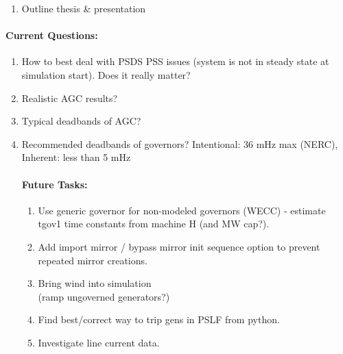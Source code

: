 \documentclass[12pt]{article}
\begin{document}
\begin{multicols}{2}
\begin{enumerate}
		\item Outline thesis \& presentation

		
		

	\end{enumerate}

	\paragraph{Current Questions:}
	\begin{enumerate}
	\item How to best deal with PSDS PSS issues (system is not in steady state at simulation start). Does it really matter?
		
	\item Realistic AGC results?
	\item Typical deadbands of AGC?
	\item Recommended deadbands of  governors? Intentional: 36 mHz max (NERC), \\Inherent: less than 5 mHz

\vfill\null
\columnbreak

\paragraph{Future Tasks:} %
	\begin{enumerate}

		\item Use generic governor for non-modeled governors (WECC) - estimate tgov1 time constants from machine H (and MW cap?).		
		
		\item Add import mirror / bypass mirror init sequence option to prevent repeated mirror creations.

		\item Bring wind into simulation \\ (ramp ungoverned generators?)

		\item Find best/correct way to trip gens in PSLF from python.

		\item Investigate line current data.
		

\end{enumerate}
\end{enumerate}
\end{multicols}
\end{document}
